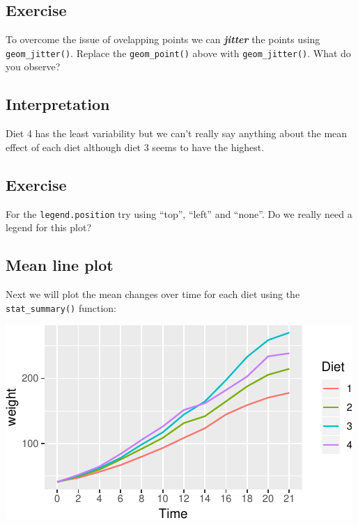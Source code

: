 \documentclass[a4paper,9pt,twocolumn,twoside,printwatermark=false]{pinp}
\begin{document}
\subsection{Exercise}\label{exercise-5}

To overcome the issue of ovelapping points we can \textbf{\emph{jitter}}
the points using \texttt{geom\_jitter()}. Replace the
\texttt{geom\_point()} above with \texttt{geom\_jitter()}. What do you
observe?

\subsection{Interpretation}\label{interpretation-2}

Diet 4 has the least variability but we can't really say anything about
the mean effect of each diet although diet 3 seems to have the highest.

\subsection{Exercise}\label{exercise-6}

For the \texttt{legend.position} try using ``top'', ``left'' and
``none''. Do we really need a legend for this plot?

\subsection{Mean line plot}\label{mean-line-plot}

Next we will plot the mean changes over time for each diet using the
\texttt{stat\_summary()} function:

\begin{Shaded}
\begin{Highlighting}[]
               \OperatorTok{+}
\StringTok{  }\NormalTok{(}\NormalTok{, }\NormalTok{) }
\end{Highlighting}
\end{Shaded}

\begin{center}\includegraphics{Getting-Started-in-R_files/figure-latex/meanlinesPlot-1} \end{center}
\end{document}
